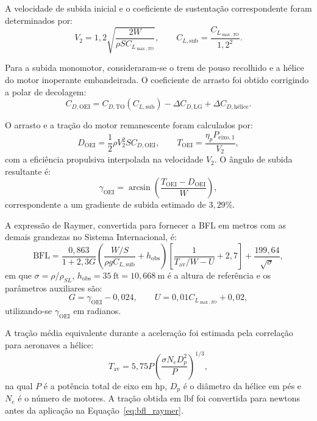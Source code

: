 A velocidade de subida inicial e o coeficiente de sustentação correspondente foram determinados por:
\begin{equation}
    V_2 = 1{,}2
    \sqrt{\frac{2W}{\rho S C_{L_{\max,TO}}}},
    \qquad
    C_{L,\mathrm{sub}} =
    \frac{C_{L_{\max,TO}}}{1{,}2^2}.
\end{equation}

Para a subida monomotor, consideraram-se o trem de pouso recolhido e a hélice do motor inoperante embandeirada. O coeficiente de arrasto foi obtido corrigindo a polar de decolagem:
\begin{equation}
    C_{D,\mathrm{OEI}} =
    C_{D,\mathrm{TO}}(C_{L,\mathrm{sub}})
    - \Delta C_{D,\mathrm{LG}}
    + \Delta C_{D,\text{hélice}}.
\end{equation}

O arrasto e a tração do motor remanescente foram calculados por:
\begin{equation}
    D_{\mathrm{OEI}} =
    \frac{1}{2}\rho V_2^2 S C_{D,\mathrm{OEI}},
    \qquad
    T_{\mathrm{OEI}} =
    \frac{\eta_p P_{\mathrm{eixo},1}}{V_2},
\end{equation}
com a eficiência propulsiva interpolada na velocidade $V_2$. O ângulo de subida resultante é:
\begin{equation}
    \gamma_{\mathrm{OEI}} =
    \arcsin\left(
    \frac{T_{\mathrm{OEI}}-D_{\mathrm{OEI}}}{W}
    \right),
\end{equation}
correspondente a um gradiente de subida estimado de $3{,}29\%$.

A expressão de Raymer, convertida para fornecer a BFL em metros com as demais grandezas no Sistema Internacional, é:
\begin{equation}
    \mathrm{BFL} =
    \frac{0{,}863}{1+2{,}3G}
    \left(
    \frac{W/S}{\rho g C_{L,\mathrm{sub}}}
    + h_{\mathrm{obs}}
    \right)
    \left[
    \frac{1}{T_{\mathrm{av}}/W-U}+2{,}7
    \right]
    + \frac{199{,}64}{\sqrt{\sigma}},
    \label{eq:bfl_raymer}
\end{equation}
em que $\sigma=\rho/\rho_{SL}$, $h_{\mathrm{obs}}=35~\mathrm{ft}=10{,}668~\mathrm{m}$ é a altura de referência e os parâmetros auxiliares são:
\begin{equation}
    G = \gamma_{\mathrm{OEI}}-0{,}024,
    \qquad
    U = 0{,}01C_{L_{\max,TO}}+0{,}02,
\end{equation}
utilizando-se $\gamma_{\mathrm{OEI}}$ em radianos.

A tração média equivalente durante a aceleração foi estimada pela correlação para aeronaves a hélice:
\begin{equation}
    T_{\mathrm{av}} =
    5{,}75P
    \left(
    \frac{\sigma N_e D_p^2}{P}
    \right)^{1/3},
\end{equation}
na qual $P$ é a potência total de eixo em hp, $D_p$ é o diâmetro da hélice em pés e $N_e$ é o número de motores. A tração obtida em lbf foi convertida para newtons antes da aplicação na Equação~\ref{eq:bfl_raymer}.

